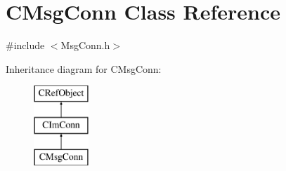\hypertarget{class_c_msg_conn}{}\section{C\+Msg\+Conn Class Reference}
\label{class_c_msg_conn}


{\ttfamily \#include $<$Msg\+Conn.\+h$>$}

Inheritance diagram for C\+Msg\+Conn\+:\begin{figure}[H]
\begin{center}
\leavevmode
\includegraphics[height=3.000000cm]{class_c_msg_conn}
\end{center}
\end{figure}
